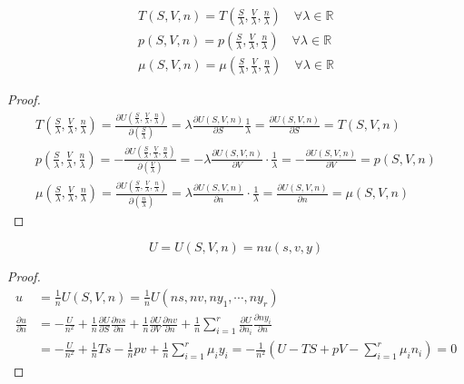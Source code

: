 \begin{corollary}
\begin{gather*}
    T(S, V, n) = T \left( \frac{S}{\lambda}, \frac{V}{\lambda}, \frac{n}{\lambda} \right)\quad \forall \lambda \in \mathbb{R}
    \\p(S, V, n) = p \left( \frac{S}{\lambda}, \frac{V}{\lambda}, \frac{n}{\lambda} \right)\quad \forall \lambda \in \mathbb{R}
    \\\mu (S, V, n) = \mu \left( \frac{S}{\lambda}, \frac{V}{\lambda}, \frac{n}{\lambda} \right)\quad \forall \lambda \in \mathbb{R}
\end{gather*}
\begin{proof}
    \begin{gather*}
        T \left( \frac{S}{\lambda}, \frac{V}{\lambda}, \frac{n}{\lambda} \right)
        = \frac{\partial U \left( \frac{S}{\lambda},\frac{V}{\lambda}, \frac{n}{\lambda} \right)}
        {\partial \left(\frac{S}{\lambda}\right)} 
     = \lambda \frac{\partial U\left( S,V,n\right)}{\partial S}  
     \frac{1}{\lambda} 
      =\frac{\partial U\left( S,V,n\right)}{\partial S}=T(S, V, n) 
\\
p\left(\frac{S}{\lambda}, \frac{V}{\lambda}, \frac{n}{\lambda}\right)
= -\frac{\partial U\left(\frac{S}{\lambda}, \frac{V}{\lambda}, \frac{n}{\lambda}\right)}
{\partial \left(\frac{V}{\lambda}\right)}
= -\lambda \frac{\partial U(S, V, n)}{\partial V} \cdot \frac{1}{\lambda}
= -\frac{\partial U(S, V, n)}{\partial V}
= p(S, V, n)
\\
\mu\left(\frac{S}{\lambda}, \frac{V}{\lambda}, \frac{n}{\lambda}\right)
= \frac{\partial U\left(\frac{S}{\lambda}, \frac{V}{\lambda}, \frac{n}{\lambda}\right)}
{\partial \left(\frac{n}{\lambda}\right)}
= \lambda \frac{\partial U(S, V, n)}{\partial n} \cdot \frac{1}{\lambda}
= \frac{\partial U(S, V, n)}{\partial n}
= \mu(S, V, n)
\end{gather*}
\end{proof}
\end{corollary}
\begin{corollary}
    \[
U = U(S, V, n) = nu(s, v, y)
\]
\begin{proof}
\begin{align*}
    u &= \frac{1}{n} U(S, V, n) = \frac{1}{n} U(ns, nv, ny_1, \cdots, ny_r)
    \\
    \frac{\partial u}{\partial n} &= -\frac{U}{n^2} + 
    \frac{1}{n} \frac{\partial U}{\partial S} \frac{\partial ns}{\partial n} 
    + \frac{1}{n} \frac{\partial U}{\partial V} \frac{\partial nv}{\partial n} 
    + \frac{1}{n} \sum_{i=1}^r \frac{\partial U}{\partial n_i} \frac{\partial ny_i}{\partial n}
    \\
    &= -\frac{U}{n^2} + \frac{1}{n} Ts - \frac{1}{n} pv 
    + \frac{1}{n} \sum_{i=1}^r \mu_i y_i = -\frac{1}{n^2} 
    \left( U - TS + pV - \sum_{i=1}^r \mu_in_i \right) = 0
\end{align*}
\end{proof}
\end{corollary}
